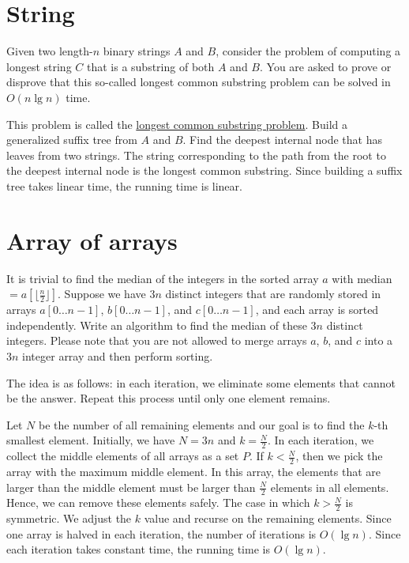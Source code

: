 \section{String}
\begin{Exercise}[title={Longest common substring problem},origin={NTU CSIE 97},difficulty=1]
Given two length-$n$ binary strings $A$ and $B$, consider the problem of computing a longest string $C$ that is a substring of both $A$ and $B$. You are asked to prove or disprove that this so-called longest common substring problem can be solved in $O(n \lg n)$ time.
\end{Exercise}
\begin{Answer}
This problem is called the \href{https://en.wikipedia.org/wiki/Longest_common_substring_problem}{longest common substring problem}. Build a generalized suffix tree from $A$ and $B$. Find the deepest internal node that has leaves from two strings. The string corresponding to the path from the root to the deepest internal node is the longest common substring. Since building a suffix tree takes linear time, the running time is linear.
\end{Answer}

\section{Array of arrays}

\begin{Exercise}[origin={NTUST CSIE 98},difficulty=1]
It is trivial to find the median of the integers in the sorted array $a$ with median $= a[\lfloor \frac{n}{2} \rfloor]$. Suppose we have $3n$ distinct integers that are randomly stored in arrays $a[0 \dots n-1]$, $b[0 \dots n-1]$, and $c[0 \dots n-1]$, and each array is sorted independently. Write an algorithm to find the median of these $3n$ distinct integers. Please note that you are not allowed to merge arrays $a$, $b$, and $c$ into a $3n$ integer array and then perform sorting. 
\end{Exercise}
\begin{Answer}
The idea is as follows:  in each iteration, we eliminate some elements that cannot be the answer. Repeat this process until only one element remains.

Let $N$ be the number of all remaining elements and our goal is to find the $k$-th smallest element. Initially, we have $N = 3n$ and $k = \frac{N}{2}$. In each iteration, we collect the middle elements of all arrays as a set $P$. If $k < \frac{N}{2}$, then we pick the array with the maximum middle element. In this array, the elements that are larger than the middle element must be larger than $\frac{N}{2}$ elements in all elements. Hence, we can remove these elements safely. The case in which $k > \frac{N}{2}$ is symmetric. We adjust the $k$ value and recurse on the remaining elements. Since one array is halved in each iteration, the number of iterations is $O(\lg n)$. Since each iteration takes constant time, the running time is $O(\lg n)$.
\end{Answer}

